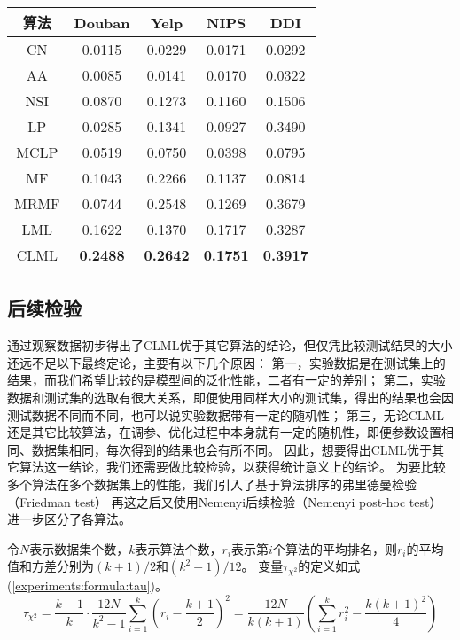 \begin{center}
    \begin{tabular}{ccccc} \hline
        算法 &	Douban & Yelp & NIPS & DDI \\ \hline
        CN  & 0.0115 & 0.0229 & 0.0171 & 0.0292 \\
        AA  & 0.0085 & 0.0141 & 0.0170 & 0.0322 \\
        NSI & 0.0870 & 0.1273 & 0.1160 & 0.1506 \\
        LP	& 0.0285 & 0.1341 & 0.0927 & 0.3490 \\
        MCLP& 0.0519 & 0.0750 & 0.0398 & 0.0795 \\
        MF  & 0.1043 & 0.2266 & 0.1137 & 0.0814 \\
        MRMF& 0.0744 & 0.2548 & 0.1269 & 0.3679 \\ \hline
        LML & 0.1622 & 0.1370 & 0.1717 & 0.3287 \\
        CLML& \bfseries 0.2488 & \bfseries 0.2642 & \bfseries 0.1751 & \bfseries 0.3917 \\ \hline
    \end{tabular}
    \label{experiments:table:aupr}
\end{center}
\zihaoxiaosi
\subsection{后续检验}

通过观察数据初步得出了CLML优于其它算法的结论，但仅凭比较测试结果的大小还远不足以下最终定论，主要有以下几个原因：
第一，实验数据是在测试集上的结果，而我们希望比较的是模型间的泛化性能，二者有一定的差别；
第二，实验数据和测试集的选取有很大关系，即便使用同样大小的测试集，得出的结果也会因测试数据不同而不同，也可以说实验数据带有一定的随机性；
第三，无论CLML还是其它比较算法，在调参、优化过程中本身就有一定的随机性，即便参数设置相同、数据集相同，每次得到的结果也会有所不同。
因此，想要得出CLML优于其它算法这一结论，我们还需要做比较检验，以获得统计意义上的结论。
为要比较多个算法在多个数据集上的性能，我们引入了基于算法排序的弗里德曼检验（Friedman test）
再这之后又使用Nemenyi后续检验（Nemenyi post-hoc test）进一步区分了各算法\cite{yang2015evaluating}\cite{demvsar2006statistical}。


令$N$表示数据集个数，$k$表示算法个数，$r_i$表示第$i$个算法的平均排名，则$r_i$的平均值和方差分别为$(k+1)/2$和$(k^2-1)/12$。
变量$\tau_{\chi^2}$的定义如式(\ref{experiments:formula:tau})。
\begin{equation}
    \tau_{\chi^2} =\frac{k-1}{k}\cdot\frac{12N}{k^2-1}\sum_{i=1}^k(r_i-\frac{k+1}{2})^2 =\frac{12N}{k(k+1)}(\sum_{i=1}^kr_i^2-\frac{k(k+1)^2}{4})
    \label{experiments:formula:tau}
\end{equation}


